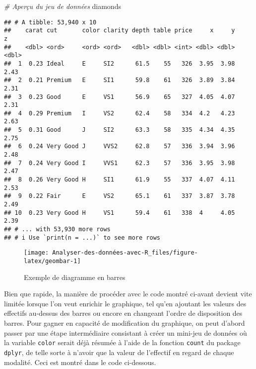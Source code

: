 \documentclass[
  french,
]{book}
\newenvironment{Shaded}{\begin{snugshade}}{\end{snugshade}}
\newcommand{\CommentTok}[1]{\textcolor[rgb]{0.56,0.35,0.01}{\textit{#1}}}
\newcommand{\DataTypeTok}[1]{\textcolor[rgb]{0.13,0.29,0.53}{#1}}
\newcommand{\KeywordTok}[1]{\textcolor[rgb]{0.13,0.29,0.53}{\textbf{#1}}}
\newcommand{\NormalTok}[1]{#1}
\newcommand{\OperatorTok}[1]{\textcolor[rgb]{0.81,0.36,0.00}{\textbf{#1}}}
\newcommand{\StringTok}[1]{\textcolor[rgb]{0.31,0.60,0.02}{#1}}
\begin{document}
\begin{Shaded}
\begin{Highlighting}[]
\CommentTok{# Aperçu du jeu de données}
\NormalTok{diamonds}
\end{Highlighting}
\end{Shaded}

\begin{verbatim}
## # A tibble: 53,940 x 10
##    carat cut       color clarity depth table price     x     y     z
##    <dbl> <ord>     <ord> <ord>   <dbl> <dbl> <int> <dbl> <dbl> <dbl>
##  1  0.23 Ideal     E     SI2      61.5    55   326  3.95  3.98  2.43
##  2  0.21 Premium   E     SI1      59.8    61   326  3.89  3.84  2.31
##  3  0.23 Good      E     VS1      56.9    65   327  4.05  4.07  2.31
##  4  0.29 Premium   I     VS2      62.4    58   334  4.2   4.23  2.63
##  5  0.31 Good      J     SI2      63.3    58   335  4.34  4.35  2.75
##  6  0.24 Very Good J     VVS2     62.8    57   336  3.94  3.96  2.48
##  7  0.24 Very Good I     VVS1     62.3    57   336  3.95  3.98  2.47
##  8  0.26 Very Good H     SI1      61.9    55   337  4.07  4.11  2.53
##  9  0.22 Fair      E     VS2      65.1    61   337  3.87  3.78  2.49
## 10  0.23 Very Good H     VS1      59.4    61   338  4     4.05  2.39
## # ... with 53,930 more rows
## # i Use `print(n = ...)` to see more rows
\end{verbatim}

\begin{Shaded}
\end{Shaded}

\begin{figure}

{\centering \texttt{[image: Analyser-des-données-avec-R\_files/figure-latex/geombar-1]} 

}

\caption{Exemple de diagramme en barres}\label{fig:geombar}
\end{figure}

Bien que rapide, la manière de procéder avec le code montré ci-avant devient vite limitée lorsque l'on veut enrichir le graphique, tel qu'en ajoutant les valeurs des effectifs au-dessus des barres ou encore en changeant l'ordre de disposition des barres. Pour gagner en capacité de modification du graphique, on peut d'abord passer par une étape intermédiaire consistant à créer un mini-jeu de données où la variable \texttt{color} serait déjà résumée à l'aide de la fonction \texttt{count} du package \texttt{dplyr}, de telle sorte à n'avoir que la valeur de l'effectif en regard de chaque modalité. Ceci est montré dans le code ci-dessous.
\end{document}
